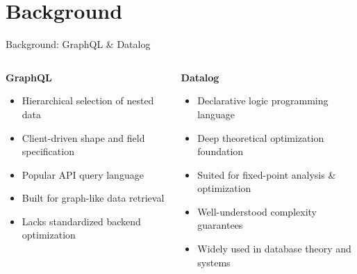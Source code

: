 \documentclass{beamer}
\begin{document}
\section{Background}
\begin{frame}{Background: GraphQL \& Datalog}
  \begin{columns}[T]
    \begin{column}{0.48\textwidth}
      \textbf{GraphQL}
      \begin{itemize}
        \item Hierarchical selection of nested data
        \item Client-driven shape and field specification
        \item Popular API query language
        \item Built for graph-like data retrieval
        \item Lacks standardized backend optimization
      \end{itemize}
    \end{column}
    \begin{column}{0.48\textwidth}
      \textbf{Datalog}
      \begin{itemize}
        \item Declarative logic programming language
        \item Deep theoretical optimization foundation
        \item Suited for fixed-point analysis \& optimization
        \item Well-understood complexity guarantees
        \item Widely used in database theory and systems
      \end{itemize}
    \end{column}
  \end{columns}
\end{frame}

\end{document}
